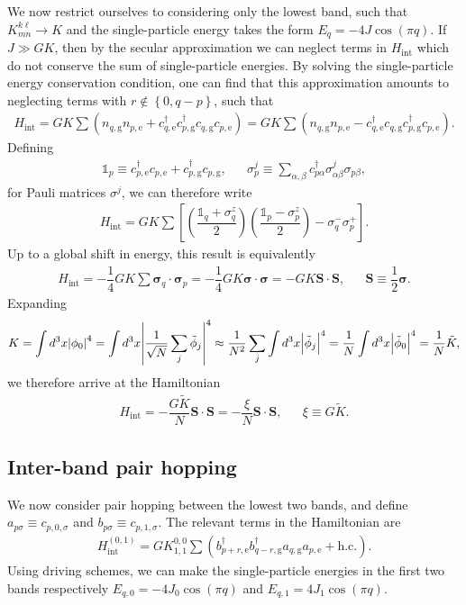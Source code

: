 \documentclass[aps,notitlepage,nofootinbib,10pt]{revtex4-1}
\renewcommand{\t}{\text} %
\newcommand{\f}[2]{\dfrac{#1}{#2}} %
\newcommand{\p}[1]{\left(#1\right)} %
\renewcommand{\sp}[1]{\left[#1\right]} %
\renewcommand{\set}[1]{\left\{#1\right\}} %
\renewcommand{\v}{\bm} %
\renewcommand{\c}{\cdot} %
\newcommand{\1}{\mathds{1}}
\newcommand{\g}{\text{g}}
\newcommand{\e}{\text{e}}
\begin{document}
We now restrict ourselves to considering only the lowest band, such
that $K^{k\ell}_{mn}\to K$ and the single-particle energy takes the
form $E_q=-4J\cos\p{\pi q}$.  If $J \gg G K$, then by the secular
approximation we can neglect terms in $H_{\t{int}}$ which do not
conserve the sum of single-particle energies.  By solving the
single-particle energy conservation condition, one can find that this
approximation amounts to neglecting terms with $r\notin\set{0,q-p}$,
such that
\begin{align}
  H_{\t{int}}
  = G K \sum \p{n_{q,\g} n_{p,\e}
    + c_{q,\e}^\dag c_{p,\g}^\dag c_{q,\g} c_{p,\e}}
  = G K \sum \p{n_{q,\g} n_{p,\e}
    - c_{q,\e}^\dag c_{q,\g} c_{p,\g}^\dag c_{p,\e}}.
\end{align}
Defining
\begin{align}
  \1_p \equiv c_{p,\e}^\dag c_{p,\e} + c_{p,\g}^\dag c_{p,\g},
  &&
  \sigma_p^j \equiv \sum_{\alpha,\beta}
  c_{p\alpha}^\dag \sigma^j_{\alpha\beta} \sigma_{p\beta},
\end{align}
for Pauli matrices $\sigma^j$, we can therefore write
\begin{align}
  H_{\t{int}} = G K \sum
  \sp{\p{\f{\1_q+\sigma_q^z}{2}} \p{\f{\1_p-\sigma_p^z}{2}}
    - \sigma_q^- \sigma_p^+}.
\end{align}
Up to a global shift in energy, this result is equivalently
\begin{align}
  H_{\t{int}}
  = - \f14 G K \sum \v\sigma_q\c\v\sigma_p
  = - \f14 G K \v\sigma \c \v\sigma
  = - G K \v S \c \v S,
  &&
  \v S \equiv \f12 \v\sigma.
\end{align}
Expanding
\begin{align}
  K = \int d^3x \abs{\phi_0}^4
  = \int d^3x \abs{\f1{\sqrt{N}}\sum_j\tilde\phi_j}^4
  \approx \f1{N^2} \sum_j \int d^3x \abs{\tilde\phi_j}^4
  = \f1N \int d^3x \abs{\tilde\phi_0}^4
  = \f1N \tilde K,
\end{align}
we therefore arrive at the Hamiltonian
\begin{align}
  H_{\t{int}}
  = - \f{G\tilde K}{N} \v S\c\v S
  = -\f{\xi}{N} \v S\c\v S,
  &&
  \xi \equiv G \tilde K.
\end{align}

\subsection{Inter-band pair hopping}

We now consider pair hopping between the lowest two bands, and define
$a_{p\sigma} \equiv c_{p,0,\sigma}$ and
$b_{p\sigma} \equiv c_{p,1,\sigma}$.  The relevant terms in the
Hamiltonian are
\begin{align}
  H_{\t{int}}^{(0,1)} = G K^{0,0}_{1,1}
  \sum \p{b_{p+r,\e}^\dag b_{q-r,\g}^\dag a_{q,\g} a_{p,\e} + \t{h.c.}}.
\end{align}
Using driving schemes, we can make the single-particle energies in the
first two bands respectively $E_{q,0}=-4J_0\cos\p{\pi q}$ and
$E_{q,1}=4J_1\cos\p{\pi q}$.
\end{document}
